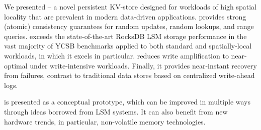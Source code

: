 We presented \sys\/ -- a novel persistent KV-store designed for workloads of high spatial locality that are prevalent in modern data-driven 
applications. \sys\/ provides strong (atomic) consistency guarantees for random updates, random lookups, and range queries. 
\sys\/ exceeds the state-of-the-art RocksDB LSM storage performance in the vast majority of YCSB benchmarks applied to both 
standard and spatially-local workloads, in which it excels in particular. \sys\/ reduces write amplification to near-optimal under write-intensive 
workloads. Finally, it provides near-instant recovery from failures, contrast to traditional data stores based on centralized write-ahead logs.

\sys\/ is presented as a conceptual prototype, which can be improved in multiple ways through ideas borrowed from LSM systems. 
It can also benefit from new hardware trends, in particular, non-volatile memory technologies.  